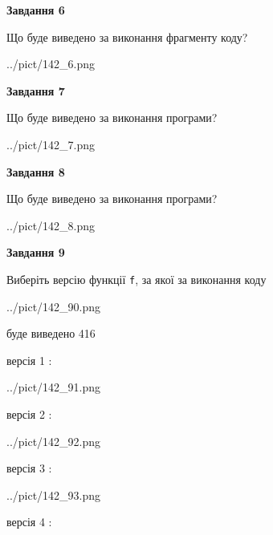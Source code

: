 \documentclass[12pt, ukrainian]{article}
\def\code#1{\Verb!#1!}
\begin{document}
{\begin {large}
{\begin {center}\textbf{Завдання 6}\end {center}}

Що буде виведено за виконання фрагменту коду?\par
\begin{center}
	{../pict/142_6.png}
\end{center}
\newpage

{\begin {center}\textbf{Завдання 7}\end {center}}

Що буде виведено за виконання програми?\par
\begin{center}
	{../pict/142_7.png}
\end{center}
\newpage

{\begin {center}\textbf{Завдання 8}\end {center}}

Що буде виведено за виконання програми?\par
\begin{center}
	{../pict/142_8.png}
\end{center}
\newpage

{\begin {center}\textbf{Завдання 9}\end {center}}

Виберіть версію функції \code{f}, за якої за виконання коду
\begin{center}
	{../pict/142_90.png}
\end{center}
буде виведено 416

\vspace{5mm}
версія 1 :

\begin{center}
	{../pict/142_91.png}
\end{center}
версія 2 :

\begin{center}
	{../pict/142_92.png}
\end{center}
версія 3 :

\begin{center}
	{../pict/142_93.png}
\end{center}
версія 4 :


\end{large}}
\end{document}
